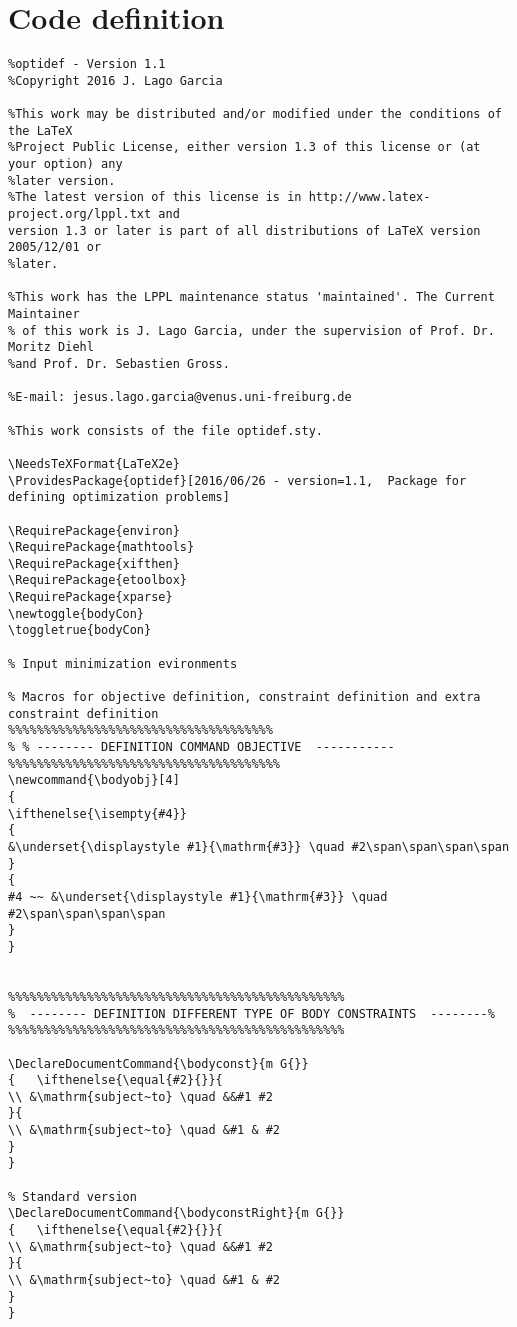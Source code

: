 \documentclass[]{report}
\begin{document}
\section{Code definition}
\begin{verbatim}
%optidef - Version 1.1
%Copyright 2016 J. Lago Garcia

%This work may be distributed and/or modified under the conditions of the LaTeX
%Project Public License, either version 1.3 of this license or (at your option) any 
%later version.
%The latest version of this license is in http://www.latex-project.org/lppl.txt and 
version 1.3 or later is part of all distributions of LaTeX version 2005/12/01 or 
%later.

%This work has the LPPL maintenance status 'maintained'. The Current Maintainer 
% of this work is J. Lago Garcia, under the supervision of Prof. Dr. Moritz Diehl 
%and Prof. Dr. Sebastien Gross.

%E-mail: jesus.lago.garcia@venus.uni-freiburg.de

%This work consists of the file optidef.sty.

\NeedsTeXFormat{LaTeX2e}
\ProvidesPackage{optidef}[2016/06/26 - version=1.1,  Package for defining optimization problems]

\RequirePackage{environ}
\RequirePackage{mathtools}	
\RequirePackage{xifthen}	
\RequirePackage{etoolbox}	
\RequirePackage{xparse}	
\newtoggle{bodyCon}
\toggletrue{bodyCon}

% Input minimization evironments

% Macros for objective definition, constraint definition and extra constraint definition
%%%%%%%%%%%%%%%%%%%%%%%%%%%%%%%%%%%%%
% % -------- DEFINITION COMMAND OBJECTIVE  -----------
%%%%%%%%%%%%%%%%%%%%%%%%%%%%%%%%%%%%%%
\newcommand{\bodyobj}[4]
{
\ifthenelse{\isempty{#4}}
{
&\underset{\displaystyle #1}{\mathrm{#3}} \quad #2\span\span\span\span
}
{
#4 ~~ &\underset{\displaystyle #1}{\mathrm{#3}} \quad #2\span\span\span\span
}
}


%%%%%%%%%%%%%%%%%%%%%%%%%%%%%%%%%%%%%%%%%%%%%%%
%  -------- DEFINITION DIFFERENT TYPE OF BODY CONSTRAINTS  --------%
%%%%%%%%%%%%%%%%%%%%%%%%%%%%%%%%%%%%%%%%%%%%%%%

\DeclareDocumentCommand{\bodyconst}{m G{}}
{	\ifthenelse{\equal{#2}{}}{
\\ &\mathrm{subject~to} \quad &&#1 #2
}{
\\ &\mathrm{subject~to} \quad &#1 & #2
}
}

% Standard version
\DeclareDocumentCommand{\bodyconstRight}{m G{}}
{	\ifthenelse{\equal{#2}{}}{
\\ &\mathrm{subject~to} \quad &&#1 #2
}{
\\ &\mathrm{subject~to} \quad &#1 & #2
}
}


\end{verbatim}
\end{document}
